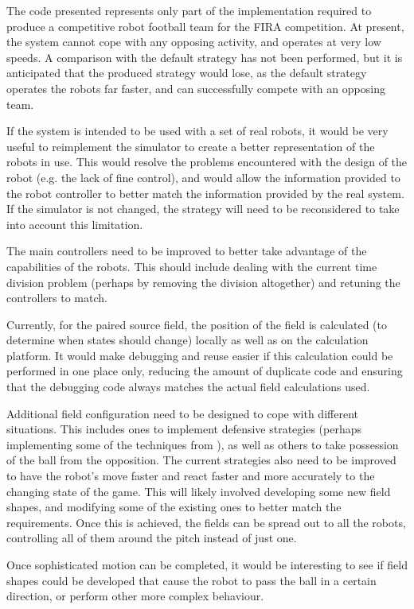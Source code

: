 \documentclass[10pt]{article}
\begin{document}
The code presented represents only part of the implementation required to
produce a competitive robot football team for the FIRA competition.  At present,
the system cannot cope with any opposing activity, and operates at very low
speeds.  A comparison with the default strategy has not been performed, but it
is anticipated that the produced strategy would lose, as the default strategy
operates the robots far faster, and can successfully compete with an opposing
team.

If the system is intended to be used with a set of real robots, it would be very
useful to reimplement the simulator to create a better representation of the
robots in use.  This would resolve the problems encountered with the design of
the robot (e.g. the lack of fine control), and would allow the information
provided to the robot controller to better match the information provided by the
real system.  If the simulator is not changed, the strategy will need to be
reconsidered to take into account this limitation.

The main controllers need to be improved to better take advantage of the
capabilities of the robots.  This should include dealing with the current time
division problem (perhaps by removing the division altogether) and retuning the
controllers to match.

Currently, for the paired source field, the position of the field is calculated
(to determine when states should change) locally as well as on the calculation
platform. It would make debugging and reuse easier if this calculation could be
performed in one place only, reducing the amount of duplicate code and ensuring
that the debugging code always matches the actual field calculations used.

Additional field configuration need to be designed to cope with different
situations.  This includes ones to implement defensive strategies (perhaps
implementing some of the techniques from \cite{neuroHassleDefence}), as well as
others to take possession of the ball from the opposition. The current
strategies also need to be improved to have the robot's move faster and react
faster and more accurately to the changing state of the game.  This will likely
involved developing some new field shapes, and modifying some of the existing
ones to better match the requirements. Once this is achieved, the fields can be
spread out to all the robots, controlling all of them around the pitch instead
of just one.

Once sophisticated motion can be completed, it would be interesting to see if
field shapes could be developed that cause the robot to pass the ball in a
certain direction, or perform other more complex behaviour.
\end{document}
